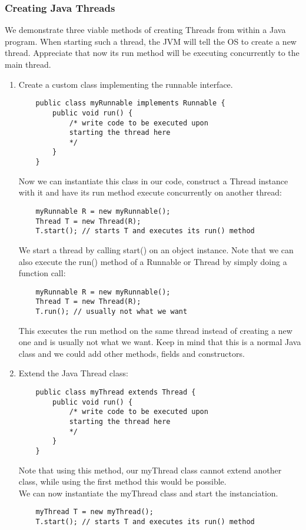\documentclass[main]{subfiles}
\begin{document}
\subsubsection{Creating Java Threads}
We demonstrate three viable methods of creating Threads from within a Java program. When starting such a thread, the JVM will tell the OS to create a new thread. Appreciate that now its run method will be executing concurrently to the main thread.
\begin{enumerate}
    \item Create a custom class implementing the runnable interface.
    \begin{verbatim}
    public class myRunnable implements Runnable {
        public void run() {
            /* write code to be executed upon
            starting the thread here
            */
        }
    }
    \end{verbatim}
    Now we can instantiate this class in our code, construct a Thread instance with it and have its run method execute concurrently on another thread:
    \begin{verbatim}
    myRunnable R = new myRunnable();
    Thread T = new Thread(R);
    T.start(); // starts T and executes its run() method
    \end{verbatim}
    We start a thread by calling start() on an object instance. Note that we can also execute the run() method of a Runnable or Thread by simply doing a function call:
    \begin{verbatim}
    myRunnable R = new myRunnable();
    Thread T = new Thread(R);
    T.run(); // usually not what we want
    \end{verbatim}
    This executes the run method on the same thread instead of creating a new one and is usually not what we want.
    Keep in mind that this is a normal Java class and we could add other methods, fields and constructors.

    \item Extend the Java Thread class:
    \begin{verbatim}
    public class myThread extends Thread {
        public void run() {
            /* write code to be executed upon
            starting the thread here
            */
        }
    }
    \end{verbatim}
    Note that using this method, our myThread class cannot extend another class, while using the first method this would be possible.\\
    We can now instantiate the myThread class and start the instanciation.
    \begin{verbatim}
    myThread T = new myThread();
    T.start(); // starts T and executes its run() method
    \end{verbatim}


\end{enumerate}
\end{document}
